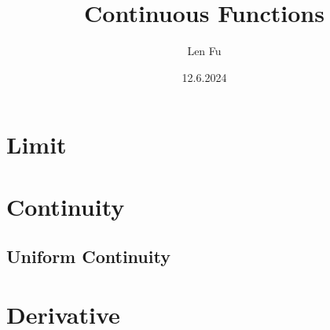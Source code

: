\documentclass{article}
\title{Continuous Functions}
\author{Len Fu}
\date{12.6.2024}
\theoremstyle{definition}
\begin{document}
\maketitle
\begin{abstract}

\end{abstract}
\tableofcontents
\newpage

\section{Limit}


\section{Continuity}

\subsection{}


\subsection{Uniform Continuity}



\section{Derivative}
\end{document}
